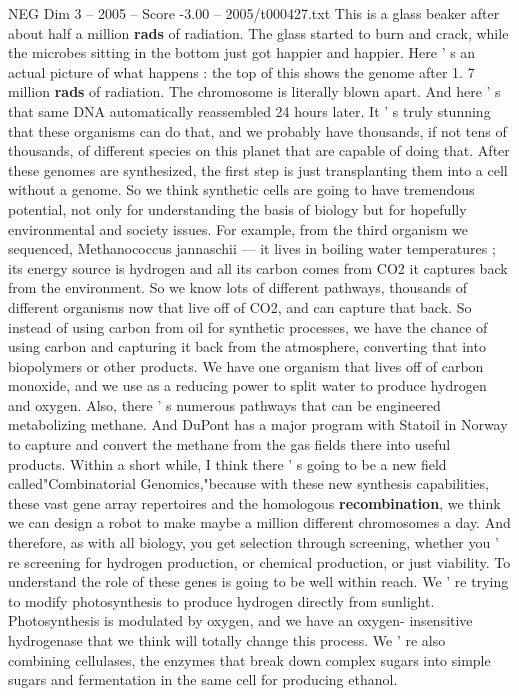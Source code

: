 \begin{textsample}{NEG Dim 3 – 2005 – Score -3.00 – 2005/t000427.txt}
This is a glass beaker after about half a million \textbf{rads} of radiation.
The glass started to burn and crack, while the microbes sitting in the bottom just got happier and happier.
Here ' s an actual picture of what happens : the top of this shows the genome after 1. 7 million \textbf{rads} of radiation.
The chromosome is literally blown apart.
And here ' s that same DNA automatically reassembled 24 hours later.
It ' s truly stunning that these organisms can do that, and we probably have thousands, if not tens of thousands, of different species on this planet that are capable of doing that.
After these genomes are synthesized, the first step is just transplanting them into a cell without a genome.
So we think synthetic cells are going to have tremendous potential, not only for understanding the basis of biology but for hopefully environmental and society issues.
For example, from the third organism we sequenced, Methanococcus jannaschii — it lives in boiling water temperatures ; its energy source is hydrogen and all its carbon comes from CO2 it captures back from the environment.
So we know lots of different pathways, thousands of different organisms now that live off of CO2, and can capture that back.
So instead of using carbon from oil for synthetic processes, we have the chance of using carbon and capturing it back from the atmosphere, converting that into biopolymers or other products.
We have one organism that lives off of carbon monoxide, and we use as a reducing power to split water to produce hydrogen and oxygen.
Also, there ' s numerous pathways that can be engineered metabolizing methane.
And DuPont has a major program with Statoil in Norway to capture and convert the methane from the gas fields there into useful products.
Within a short while, I think there ' s going to be a new field called"Combinatorial Genomics,"because with these new synthesis capabilities, these vast gene array repertoires and the homologous \textbf{recombination}, we think we can design a robot to make maybe a million different chromosomes a day.
And therefore, as with all biology, you get selection through screening, whether you ' re screening for hydrogen production, or chemical production, or just viability.
To understand the role of these genes is going to be well within reach.
We ' re trying to modify photosynthesis to produce hydrogen directly from sunlight.
Photosynthesis is modulated by oxygen, and we have an oxygen- insensitive hydrogenase that we think will totally change this process.
We ' re also combining cellulases, the enzymes that break down complex sugars into simple sugars and fermentation in the same cell for producing ethanol.

\end{textsample}
